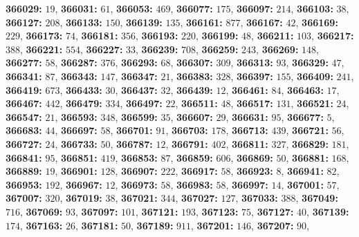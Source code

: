 \textsf{\bfseries 366029:} $19$, \textsf{\bfseries 366031:} $61$, \textsf{\bfseries 366053:} $469$, \textsf{\bfseries 366077:} $175$, \textsf{\bfseries 366097:} $214$, \textsf{\bfseries 366103:} $38$, \textsf{\bfseries 366127:} $208$, \textsf{\bfseries 366133:} $150$, \textsf{\bfseries 366139:} $135$, \textsf{\bfseries 366161:} $877$, \textsf{\bfseries 366167:} $42$, \textsf{\bfseries 366169:} $229$, \textsf{\bfseries 366173:} $74$, \textsf{\bfseries 366181:} $356$, \textsf{\bfseries 366193:} $220$, \textsf{\bfseries 366199:} $48$, \textsf{\bfseries 366211:} $103$, \textsf{\bfseries 366217:} $388$, \textsf{\bfseries 366221:} $554$, \textsf{\bfseries 366227:} $33$, \textsf{\bfseries 366239:} $708$, \textsf{\bfseries 366259:} $243$, \textsf{\bfseries 366269:} $148$, \textsf{\bfseries 366277:} $58$, \textsf{\bfseries 366287:} $376$, \textsf{\bfseries 366293:} $68$, \textsf{\bfseries 366307:} $309$, \textsf{\bfseries 366313:} $93$, \textsf{\bfseries 366329:} $47$, \textsf{\bfseries 366341:} $87$, \textsf{\bfseries 366343:} $147$, \textsf{\bfseries 366347:} $21$, \textsf{\bfseries 366383:} $328$, \textsf{\bfseries 366397:} $155$, \textsf{\bfseries 366409:} $241$, \textsf{\bfseries 366419:} $673$, \textsf{\bfseries 366433:} $30$, \textsf{\bfseries 366437:} $32$, \textsf{\bfseries 366439:} $12$, \textsf{\bfseries 366461:} $84$, \textsf{\bfseries 366463:} $17$, \textsf{\bfseries 366467:} $442$, \textsf{\bfseries 366479:} $334$, \textsf{\bfseries 366497:} $22$, \textsf{\bfseries 366511:} $48$, \textsf{\bfseries 366517:} $131$, \textsf{\bfseries 366521:} $24$, \textsf{\bfseries 366547:} $21$, \textsf{\bfseries 366593:} $348$, \textsf{\bfseries 366599:} $35$, \textsf{\bfseries 366607:} $29$, \textsf{\bfseries 366631:} $95$, \textsf{\bfseries 366677:} $5$, \textsf{\bfseries 366683:} $44$, \textsf{\bfseries 366697:} $58$, \textsf{\bfseries 366701:} $91$, \textsf{\bfseries 366703:} $178$, \textsf{\bfseries 366713:} $439$, \textsf{\bfseries 366721:} $56$, \textsf{\bfseries 366727:} $24$, \textsf{\bfseries 366733:} $50$, \textsf{\bfseries 366787:} $12$, \textsf{\bfseries 366791:} $402$, \textsf{\bfseries 366811:} $327$, \textsf{\bfseries 366829:} $181$, \textsf{\bfseries 366841:} $95$, \textsf{\bfseries 366851:} $419$, \textsf{\bfseries 366853:} $87$, \textsf{\bfseries 366859:} $606$, \textsf{\bfseries 366869:} $50$, \textsf{\bfseries 366881:} $168$, \textsf{\bfseries 366889:} $19$, \textsf{\bfseries 366901:} $128$, \textsf{\bfseries 366907:} $222$, \textsf{\bfseries 366917:} $58$, \textsf{\bfseries 366923:} $8$, \textsf{\bfseries 366941:} $82$, \textsf{\bfseries 366953:} $192$, \textsf{\bfseries 366967:} $12$, \textsf{\bfseries 366973:} $58$, \textsf{\bfseries 366983:} $58$, \textsf{\bfseries 366997:} $14$, \textsf{\bfseries 367001:} $57$, \textsf{\bfseries 367007:} $320$, \textsf{\bfseries 367019:} $38$, \textsf{\bfseries 367021:} $344$, \textsf{\bfseries 367027:} $127$, \textsf{\bfseries 367033:} $388$, \textsf{\bfseries 367049:} $716$, \textsf{\bfseries 367069:} $93$, \textsf{\bfseries 367097:} $101$, \textsf{\bfseries 367121:} $193$, \textsf{\bfseries 367123:} $75$, \textsf{\bfseries 367127:} $40$, \textsf{\bfseries 367139:} $174$, \textsf{\bfseries 367163:} $26$, \textsf{\bfseries 367181:} $50$, \textsf{\bfseries 367189:} $911$, \textsf{\bfseries 367201:} $146$, \textsf{\bfseries 367207:} $90$, 
